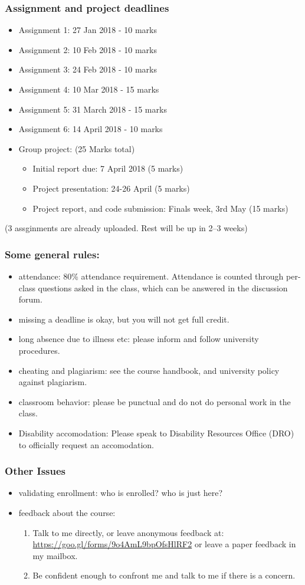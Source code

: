 \documentclass{beamer}
\begin{document}
\begin{frame}
\frametitle{Assignment and project deadlines}
\begin{itemize}
\item Assignment 1: 27 Jan 2018 - 10 marks
\item Assignment 2: 10 Feb 2018 - 10 marks
\item Assignment 3: 24 Feb 2018 - 10 marks
\item Assignment 4: 10 Mar 2018 - 15 marks
\item Assignment 5: 31 March 2018 - 15 marks
\item Assignment 6: 14 April 2018 - 10 marks
\item Group project: (25 Marks total)
\begin{itemize}
\item Initial report due: 7 April 2018 (5 marks)
\item Project presentation: 24-26 April (5 marks)
\item Project report, and code submission: Finals week, 3rd May (15 marks)
\end{itemize}
\end{itemize}
(3 assginments are already uploaded. Rest will be up in 2--3 weeks)
\end{frame}

\begin{frame}
\frametitle{Some general rules:}
\begin{itemize}
\item attendance: 80\% attendance requirement. Attendance is counted through per-class questions asked in the class, which can be answered in the discussion forum. 
\item missing a deadline is okay, but you will not get full credit.
\item long absence due to illness etc: please inform and follow university procedures.
\item cheating and plagiarism: see the course handbook, and university policy against plagiarism.
\item classroom behavior: please be punctual and do not do personal work in the class.
\item Disability accomodation: Please speak to Disability Resources Office (DRO) to officially request an accomodation.
\end{itemize}
\end{frame}

\begin{frame}
\frametitle{Other Issues}
\begin{itemize}
\item validating enrollment: who is enrolled? who is just here?
\item feedback about the course: 
\begin{enumerate}
\item Talk to me directly, or leave anonymous feedback at: \url{https://goo.gl/forms/9o4AmL9bpOfsHlRF2} or leave a paper feedback in my mailbox. 
\item Be confident enough to confront me and talk to me if there is a concern. 
\end{enumerate}
\end{itemize}
\end{frame}
\end{document}
